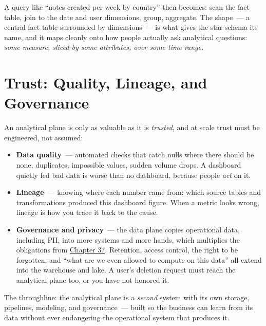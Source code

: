 \noindent{}A query like ``notes created per week by country'' then becomes: scan the fact table, join to the date and user dimensions, group, aggregate. The shape~--- a central fact table surrounded by dimensions~--- is what gives the star schema its name, and it maps cleanly onto how people actually ask analytical questions: \emph{some measure, sliced by some attributes, over some time range.}

\setcounter{section}{4}
\section{Trust: Quality, Lineage, and Governance}\label{42-data-analytics-plane:425-trust-quality-lineage-and-governance}

An analytical plane is only as valuable as it is \emph{trusted}, and at scale trust must be engineered, not assumed:

\begin{itemize}
\tightlist
\item
  \textbf{Data quality}~--- automated checks that catch nulls where there should be none, duplicates, impossible values, sudden volume drops. A dashboard quietly fed bad data is worse than no dashboard, because people \emph{act} on it.
\item
  \textbf{Lineage}~--- knowing where each number came from: which source tables and transformations produced this dashboard figure. When a metric looks wrong, lineage is how you trace it back to the cause.
\item
  \textbf{Governance and privacy}~--- the data plane copies operational data, including PII, into more systems and more hands, which multiplies the obligations from \hyperref[ch:37-reliability]{Chapter 37}. Retention, access control, the right to be forgotten, and ``what are we even allowed to compute on this data'' all extend into the warehouse and lake. A user's deletion request must reach the analytical plane too, or you have not honored it.
\end{itemize}

\noindent{}The throughline: the analytical plane is a \emph{second} system with its own storage, pipelines, modeling, and governance~--- built so the business can learn from its data without ever endangering the operational system that produces it.

